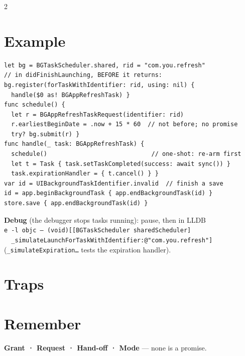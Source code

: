 \documentclass[8pt]{extarticle}
\begin{document}
\begin{multicols}{2}
\section{Example}
\begin{lstlisting}[language=SwiftSheet]
let bg = BGTaskScheduler.shared, rid = "com.you.refresh"
// in didFinishLaunching, BEFORE it returns:
bg.register(forTaskWithIdentifier: rid, using: nil) {
  handle($0 as! BGAppRefreshTask) }
func schedule() {
  let r = BGAppRefreshTaskRequest(identifier: rid)
  r.earliestBeginDate = .now + 15 * 60  // not before; no promise
  try? bg.submit(r) }
func handle(_ task: BGAppRefreshTask) {
  schedule()                             // one-shot: re-arm first
  let t = Task { task.setTaskCompleted(success: await sync()) }
  task.expirationHandler = { t.cancel() } }
var id = UIBackgroundTaskIdentifier.invalid  // finish a save
id = app.beginBackgroundTask { app.endBackgroundTask(id) }
store.save { app.endBackgroundTask(id) }
\end{lstlisting}
\textbf{Debug} (the debugger stops tasks running): pause, then in LLDB\\
\texttt{\scriptsize e -l objc -- (void)[[BGTaskScheduler sharedScheduler]}\\
\texttt{\scriptsize\ \ \_simulateLaunchForTaskWithIdentifier:@"com.you.refresh"]}\\
(\texttt{\_simulateExpiration\dots} tests the expiration handler).

\section{Traps}
\begin{itemize}
\end{itemize}

\section{Remember}
\textbf{Grant · Request · Hand-off · Mode} — none is a promise.

\end{multicols}

\end{document}
